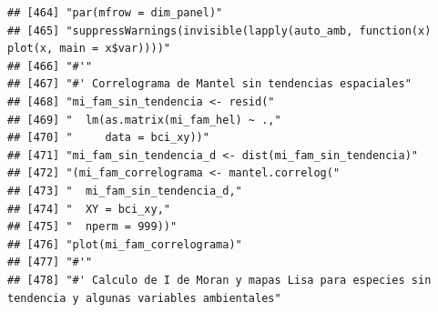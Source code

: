 \documentclass[11pt,]{article}
\begin{document}
\begin{verbatim}
## [464] "par(mfrow = dim_panel)"                                                                                                                                                
## [465] "suppressWarnings(invisible(lapply(auto_amb, function(x) plot(x, main = x$var))))"                                                                                      
## [466] "#'"                                                                                                                                                                    
## [467] "#' Correlograma de Mantel sin tendencias espaciales"                                                                                                                   
## [468] "mi_fam_sin_tendencia <- resid("                                                                                                                                        
## [469] "  lm(as.matrix(mi_fam_hel) ~ .,"                                                                                                                                       
## [470] "     data = bci_xy))"                                                                                                                                                  
## [471] "mi_fam_sin_tendencia_d <- dist(mi_fam_sin_tendencia)"                                                                                                                  
## [472] "(mi_fam_correlograma <- mantel.correlog("                                                                                                                              
## [473] "  mi_fam_sin_tendencia_d,"                                                                                                                                             
## [474] "  XY = bci_xy,"                                                                                                                                                        
## [475] "  nperm = 999))"                                                                                                                                                       
## [476] "plot(mi_fam_correlograma)"                                                                                                                                             
## [477] "#'"                                                                                                                                                                    
## [478] "#' Calculo de I de Moran y mapas Lisa para especies sin tendencia y algunas variables ambientales"                                                                     

\end{verbatim}
\end{document}
